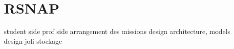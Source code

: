 \section{RSNAP}
student side
prof side
arrangement des missions
design architecture, models
design joli
stockage